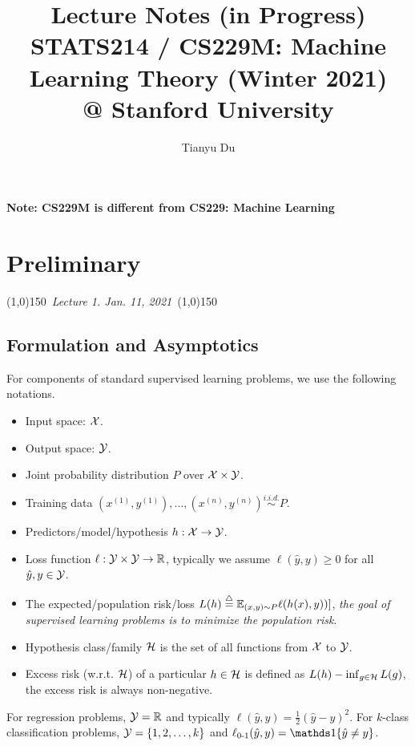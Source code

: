 \documentclass[11pt]{article}
\title{Lecture Notes (in Progress) \\ STATS214 / CS229M: Machine Learning Theory (Winter 2021) \\ @ Stanford University}
\author{Tianyu Du}
\newcommand{\yhat}[0]{\hat{y}}
\newcommand{\defas}[0]{\overset{\triangle}{=}}
\newcommand{\dash}[0]{\text{-}}
\begin{document}
	\maketitle
	\textbf{Note: CS229M is different from CS229: Machine Learning}
	\section{Preliminary}
	\begin{center}
	\line(1,0){150}\ \emph{Lecture 1. Jan. 11, 2021}\ \line(1,0){150}
	\end{center}
	\subsection{Formulation and Asymptotics}
	\par For components of standard supervised learning problems, we use the following notations.
	\begin{itemize}
		\item Input space: $\mathcal{{X}}$.
		\item Output space: $\mathcal{{Y}}$.
		\item Joint probability distribution $P$ over $\mathcal{{X}} \times \mathcal{{Y}}$.
		\item Training data $(x^{(1)}, y^{(1)}), \dots, (x^{(n)}, y^{(n)}) \overset{i.i.d.}{\sim} P$.
		\item Predictors/model/hypothesis $h: \mathcal{{X}} \to \mathcal{{Y}}$.
		\item Loss function $\ell: \mathcal{{Y}} \times \mathcal{{Y}} \to \mathbb{R}$, typically we assume $\ell(\yhat, y) \geq 0$ for all $\yhat, y \in \mc{Y}$.
		\item The expected/population risk/loss $L(h) \defas \expe_{(x,y)\sim P} \ell(h(x), y))]$, \emph{the goal of supervised learning problems is to minimize the population risk}.
		\item Hypothesis class/family $\mathcal{{H}}$ is the set of all functions from $\mathcal{{X}}$ to $\mathcal{{Y}}$.
		\item Excess risk (w.r.t. $\mathcal{{H}}$) of a particular $h \in \mathcal{{H}}$ is defined as $L(h) - \inf_{g \in \mathcal{{H}}} L(g)$, the excess risk is always non-negative.
	\end{itemize}
	\begin{example}
		For regression problems, $\mathcal{{Y}} = \mathbb{R}$ and typically $\ell(\yhat, y) = \frac{1}{2} (\yhat - y)^2$. For $k$-class classification problems, $\mathcal{{Y}} = \{1, 2, \dots, k\}$ and $\ell_{0\dash 1}(\yhat, y) = \id{\yhat \neq y}$.
	\end{example}
\end{document}

